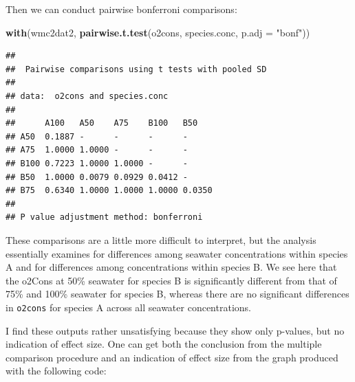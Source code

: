 \documentclass[
  12pt,
]{book}
\newenvironment{Shaded}{\begin{snugshade}}{\end{snugshade}}
\newcommand{\DataTypeTok}[1]{\textcolor[rgb]{0.13,0.29,0.53}{#1}}
\newcommand{\KeywordTok}[1]{\textcolor[rgb]{0.13,0.29,0.53}{\textbf{#1}}}
\newcommand{\NormalTok}[1]{#1}
\newcommand{\OperatorTok}[1]{\textcolor[rgb]{0.81,0.36,0.00}{\textbf{#1}}}
\newcommand{\StringTok}[1]{\textcolor[rgb]{0.31,0.60,0.02}{#1}}
\begin{document}
\begin{Shaded}
\end{Shaded}

Then we can conduct pairwise bonferroni comparisons:

\begin{Shaded}
\begin{Highlighting}[]
\KeywordTok{with}\NormalTok{(wmc2dat2, }\KeywordTok{pairwise.t.test}\NormalTok{(o2cons, species.conc, }\DataTypeTok{p.adj =} \StringTok{"bonf"}\NormalTok{))}
\end{Highlighting}
\end{Shaded}

\begin{verbatim}
## 
##  Pairwise comparisons using t tests with pooled SD 
## 
## data:  o2cons and species.conc 
## 
##      A100   A50    A75    B100   B50   
## A50  0.1887 -      -      -      -     
## A75  1.0000 1.0000 -      -      -     
## B100 0.7223 1.0000 1.0000 -      -     
## B50  1.0000 0.0079 0.0929 0.0412 -     
## B75  0.6340 1.0000 1.0000 1.0000 0.0350
## 
## P value adjustment method: bonferroni
\end{verbatim}

These comparisons are a little more difficult to interpret, but the analysis essentially examines for differences among seawater concentrations within species A and for differences among concentrations within species B. We see here that the o2Cons at 50\% seawater for species B is significantly different from that of 75\% and 100\% seawater for species B, whereas there are no significant differences in \texttt{o2cons} for species A across all seawater concentrations.

I find these outputs rather unsatisfying because they show only p-values, but no indication of effect size. One can get both the conclusion from the multiple comparison procedure and an indication of effect size from the graph produced with the following code:
\end{document}
